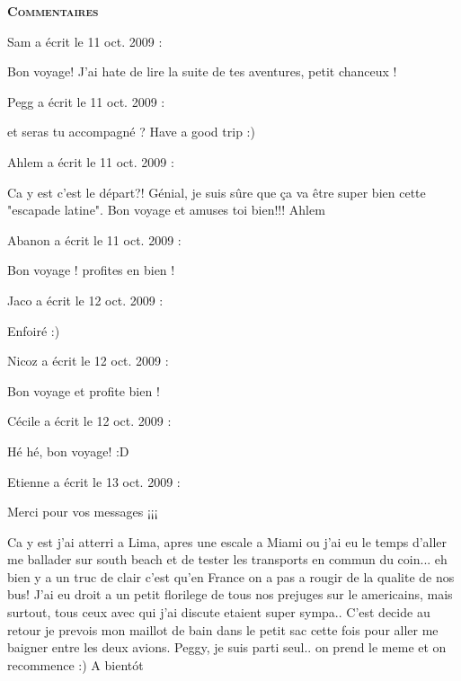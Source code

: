 \bigskip
\textbf{\textsc{Commentaires}}

\medskip
Sam a écrit le 11 oct. 2009 :
\begin{displayquote}
Bon voyage! J'ai hate de lire la suite de tes aventures, petit chanceux !
\end{displayquote}

\medskip
Pegg a écrit le 11 oct. 2009 :
\begin{displayquote}
et seras tu accompagné ? Have a good trip :)
\end{displayquote}

\medskip
Ahlem a écrit le 11 oct. 2009 :
\begin{displayquote}
Ca y est c'est le départ?!
Génial, je suis sûre que ça va être super bien cette "escapade latine".
Bon voyage et amuses toi bien!!!
Ahlem
\end{displayquote}

\medskip
Abanon a écrit le 11 oct. 2009 :
\begin{displayquote}
Bon voyage ! profites en bien !
\end{displayquote}

\medskip
Jaco a écrit le 12 oct. 2009 :
\begin{displayquote}
Enfoiré :)
\end{displayquote}

\medskip
Nicoz a écrit le 12 oct. 2009 :
\begin{displayquote}
Bon voyage et profite bien !
\end{displayquote}

\medskip
Cécile a écrit le 12 oct. 2009 :
\begin{displayquote}
Hé hé, bon voyage! :D
\end{displayquote}

\medskip
Etienne a écrit le 13 oct. 2009 :
\begin{displayquote}
Merci pour vos messages ¡¡¡

Ca y est j'ai atterri a Lima, apres une escale a Miami ou j'ai eu le temps d'aller me ballader sur south beach et de tester les transports en commun du coin... eh bien y a un truc de clair c'est qu'en France on a pas a rougir de la qualite de nos bus! J'ai eu droit a un petit florilege de tous nos prejuges sur le americains, mais surtout, tous ceux avec qui j'ai discute etaient super sympa..
C'est decide au retour je prevois mon maillot de bain dans le petit sac cette fois pour aller me baigner entre les deux avions.
Peggy, je suis parti seul.. on prend le meme et on recommence :)
A bientót
\end{displayquote}

